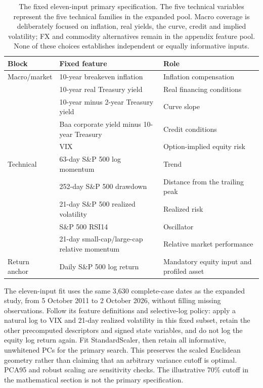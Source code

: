 \documentclass[11pt,a4paper]{article}
\begin{document}
\begin{table}[htbp]
\centering
\small
\begin{tabularx}{\textwidth}{@{}lXX@{}}
\toprule
Block & Fixed feature & Role\\
\midrule
Macro/market & 10-year breakeven inflation & Inflation compensation\\
& 10-year real Treasury yield & Real financing conditions\\
& 10-year minus 2-year Treasury yield & Curve slope\\
& Baa corporate yield minus 10-year Treasury & Credit conditions\\
& VIX & Option-implied equity risk\\[3pt]
Technical & 63-day S\&P 500 log momentum & Trend\\
& 252-day S\&P 500 drawdown & Distance from the trailing peak\\
& 21-day S\&P 500 realized volatility & Realized risk\\
& S\&P 500 RSI14 & Oscillator\\
& 21-day small-cap/large-cap relative momentum & Relative market performance\\[3pt]
Return anchor & Daily S\&P 500 log return & Mandatory equity input and profiled asset\\
\bottomrule
\end{tabularx}
\caption{The fixed eleven-input primary specification. The five technical variables represent the five technical families in the expanded pool. Macro coverage is deliberately focused on inflation, real yields, the curve, credit and implied volatility; FX and commodity alternatives remain in the appendix feature pool. None of these choices establishes independent or equally informative inputs.}
\label{tab:primary-features}
\end{table}

The eleven-input fit uses the same 3,630 complete-case dates as the expanded study, from 5 October 2011 to 2 October 2026, without filling missing observations. Follow its feature definitions and selective-log policy: apply a natural log to VIX and 21-day realized volatility in this fixed subset, retain the other precomputed descriptors and signed state variables, and do not log the equity log return again. Fit StandardScaler, then retain all informative, unwhitened PCs for the primary search. This preserves the scaled Euclidean geometry rather than claiming that an arbitrary variance cutoff is optimal. PCA95 and robust scaling are sensitivity checks. The illustrative 70\% cutoff in the mathematical section is not the primary specification.
\end{document}
